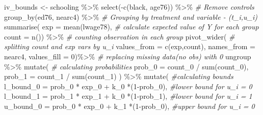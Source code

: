 \documentclass[
]{article}
\newenvironment{Shaded}{\begin{snugshade}}{\end{snugshade}}
\newcommand{\AttributeTok}[1]{\textcolor[rgb]{0.77,0.63,0.00}{#1}}
\newcommand{\CommentTok}[1]{\textcolor[rgb]{0.56,0.35,0.01}{\textit{#1}}}
\newcommand{\DecValTok}[1]{\textcolor[rgb]{0.00,0.00,0.81}{#1}}
\newcommand{\FunctionTok}[1]{\textcolor[rgb]{0.00,0.00,0.00}{#1}}
\newcommand{\NormalTok}[1]{#1}
\newcommand{\OtherTok}[1]{\textcolor[rgb]{0.56,0.35,0.01}{#1}}
\newcommand{\SpecialCharTok}[1]{\textcolor[rgb]{0.00,0.00,0.00}{#1}}
\begin{document}
\begin{Shaded}
\begin{Highlighting}[]
\NormalTok{iv\_bounds }\OtherTok{\textless{}{-}}\NormalTok{ schooling }\SpecialCharTok{\%\textgreater{}\%}
  \FunctionTok{select}\NormalTok{(}\SpecialCharTok{{-}}\FunctionTok{c}\NormalTok{(black, age76)) }\SpecialCharTok{\%\textgreater{}\%}     \CommentTok{\# Remove controls}
  \FunctionTok{group\_by}\NormalTok{(ed76, nearc4) }\SpecialCharTok{\%\textgreater{}\%}       \CommentTok{\# Grouping by treatment and variable {-} (t\_i,u\_i)}
  \FunctionTok{summarise}\NormalTok{(}
    \AttributeTok{exp =} \FunctionTok{mean}\NormalTok{(lwage78),           }\CommentTok{\# calculate expected value of Y for each group}
    \AttributeTok{count =} \FunctionTok{n}\NormalTok{()) }\SpecialCharTok{\%\textgreater{}\%}               \CommentTok{\# counting observation in each group}
  \FunctionTok{pivot\_wider}\NormalTok{(                     }\CommentTok{\# splitting count and exp vars by u\_i }
    \AttributeTok{values\_from =} \FunctionTok{c}\NormalTok{(exp,count),}
    \AttributeTok{names\_from =}\NormalTok{ nearc4,}
    \AttributeTok{values\_fill =} \DecValTok{0}\NormalTok{)}\SpecialCharTok{\%\textgreater{}\%}            \CommentTok{\# replacing missing data(no obs) with 0}
\NormalTok{    ungroup }\SpecialCharTok{\%\textgreater{}\%} 
  \FunctionTok{mutate}\NormalTok{(                          }\CommentTok{\# calculating probabilities}
    \AttributeTok{prob\_0 =}\NormalTok{ count\_0 }\SpecialCharTok{/} \FunctionTok{sum}\NormalTok{(count\_0),}
    \AttributeTok{prob\_1 =}\NormalTok{ count\_1 }\SpecialCharTok{/} \FunctionTok{sum}\NormalTok{(count\_1)}
\NormalTok{    ) }\SpecialCharTok{\%\textgreater{}\%}
    \FunctionTok{mutate}\NormalTok{(                                         }\CommentTok{\#calculating bounds}
      \AttributeTok{l\_bound\_0 =}\NormalTok{ prob\_0 }\SpecialCharTok{*}\NormalTok{ exp\_0 }\SpecialCharTok{+}\NormalTok{ k\_0 }\SpecialCharTok{*}\NormalTok{(}\DecValTok{1}\SpecialCharTok{{-}}\NormalTok{prob\_0), }\CommentTok{\#lower bound for u\_i = 0 }
      \AttributeTok{l\_bound\_1 =}\NormalTok{ prob\_1 }\SpecialCharTok{*}\NormalTok{ exp\_1 }\SpecialCharTok{+}\NormalTok{ k\_0 }\SpecialCharTok{*}\NormalTok{(}\DecValTok{1}\SpecialCharTok{{-}}\NormalTok{prob\_1), }\CommentTok{\#lower bound for u\_i = 1}
      \AttributeTok{u\_bound\_0 =}\NormalTok{ prob\_0 }\SpecialCharTok{*}\NormalTok{ exp\_0 }\SpecialCharTok{+}\NormalTok{ k\_1 }\SpecialCharTok{*}\NormalTok{(}\DecValTok{1}\SpecialCharTok{{-}}\NormalTok{prob\_0), }\CommentTok{\#upper bound for u\_i = 0}

\end{Highlighting}
\end{Shaded}
\end{document}
